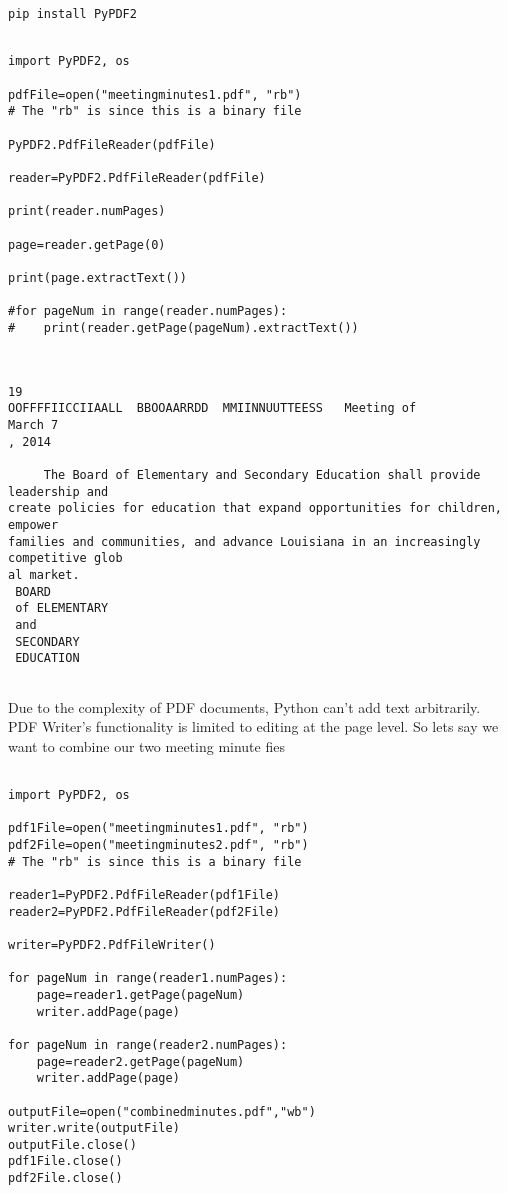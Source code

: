 \documentclass[11pt]{article}
\begin{document}
\begin{verbatim}
pip install PyPDF2
\end{verbatim}

\begin{verbatim}

import PyPDF2, os

pdfFile=open("meetingminutes1.pdf", "rb")
# The "rb" is since this is a binary file

PyPDF2.PdfFileReader(pdfFile)

reader=PyPDF2.PdfFileReader(pdfFile)

print(reader.numPages)

page=reader.getPage(0)

print(page.extractText())

#for pageNum in range(reader.numPages):
#    print(reader.getPage(pageNum).extractText())



\end{verbatim}

\begin{verbatim}
19
OOFFFFIICCIIAALL  BBOOAARRDD  MMIINNUUTTEESS   Meeting of 
March 7
, 2014
        
     The Board of Elementary and Secondary Education shall provide leadership and 
create policies for education that expand opportunities for children, empower 
families and communities, and advance Louisiana in an increasingly 
competitive glob
al market.
 BOARD 
 of ELEMENTARY
 and 
 SECONDARY
 EDUCATION
  
\end{verbatim}

Due to the complexity of PDF documents, Python can't add text arbitrarily. PDF Writer's functionality is limited to editing at the page level. So lets say we want to combine our two meeting minute fies

\begin{verbatim}

import PyPDF2, os

pdf1File=open("meetingminutes1.pdf", "rb")
pdf2File=open("meetingminutes2.pdf", "rb")
# The "rb" is since this is a binary file

reader1=PyPDF2.PdfFileReader(pdf1File)
reader2=PyPDF2.PdfFileReader(pdf2File)

writer=PyPDF2.PdfFileWriter()

for pageNum in range(reader1.numPages):
    page=reader1.getPage(pageNum)
    writer.addPage(page)

for pageNum in range(reader2.numPages):
    page=reader2.getPage(pageNum)
    writer.addPage(page)

outputFile=open("combinedminutes.pdf","wb")
writer.write(outputFile)
outputFile.close()
pdf1File.close()
pdf2File.close()

\end{verbatim}
\end{document}
